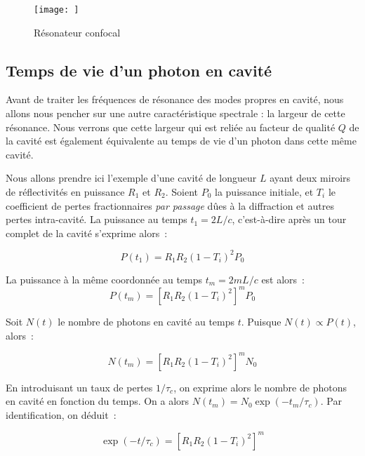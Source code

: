 \documentclass[a4paper]{book}
\begin{document}
    
    
\begin{figure}[!htbp]
\begin{center}
\texttt{[image: ]}
\end{center}
\caption{Résonateur confocal}
\label{fig:resonateur_confocal}
\end{figure}

\subsection{Temps de vie d'un photon en cavité}

Avant de traiter les fréquences de résonance des modes propres en cavité, nous allons nous pencher sur une autre caractéristique spectrale : la largeur de cette résonance. Nous verrons que cette largeur qui est reliée au facteur de qualité $Q$ de la cavité est également équivalente au temps de vie d'un photon dans cette même cavité. 

Nous allons prendre ici l'exemple d'une cavité de longueur $L$ ayant deux miroirs de réflectivités en puissance $R_1$ et $R_2$. Soient $P_0$ la puissance initiale, et $T_i$ le coefficient de pertes fractionnaires \textit{par passage} dûes à la diffraction et autres pertes intra-cavité. La puissance au temps $t_1=2L/c$, c'est-à-dire après un tour complet de la cavité s'exprime alors~: 

\begin{equation}
    P(t_1)=R_1R_2(1-T_i)^2P_0
\end{equation}

La puissance à la même coordonnée au temps $t_m = 2mL/c$ est alors~:
\begin{equation}
    P(t_m)=\left[R_1R_2(1-T_i)^2\right]^mP_0
\end{equation}

Soit $N(t)$ le nombre de photons en cavité au temps $t$. Puisque $N(t)\propto P(t)$, alors~:

\begin{equation}
    N(t_m)=\left[R_1R_2(1-T_i)^2\right]^mN_0
\end{equation}

En introduisant un taux de pertes $1/\tau_c$, on exprime alors le nombre de photons en cavité en fonction du temps. On a alors $N(t_m) = N_0\exp(-t_m/\tau_c)$. Par identification, on déduit~:

\begin{equation}
    \exp(-t/\tau_c)=\left[R_1R_2(1-T_i)^2\right]^m
\end{equation}
\end{document}
